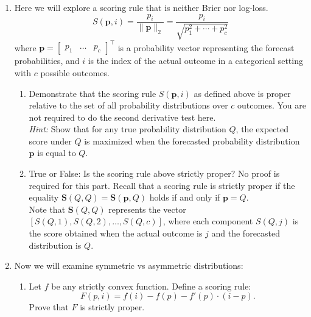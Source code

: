 \documentclass[11pt]{article}
\begin{document}
\begin{enumerate}
    \item Here we will explore a scoring rule that is neither Brier nor log-loss.
$$
S(\mathbf{p}, i) = \frac{p_i}{\|\mathbf{p}\|_{2}} = \frac{p_i}{\sqrt{p_1^2 + \cdots + p_c^2}}
$$
where \( \mathbf{p} = \begin{bmatrix}    
p_1 & \ldots & p_c 
\end{bmatrix}^\top
\) is a probability vector representing the forecast probabilities, and \( i \) is the index of the actual outcome in a categorical setting with \( c \) possible outcomes.
\begin{enumerate}
    \item Demonstrate that the scoring rule \( S(\mathbf{p}, i) \) as defined above is proper relative to the set of all probability distributions over \( c \) outcomes. You are not required to do the second derivative test here. \\
    \textit{Hint:} Show that for any true probability distribution \( Q \), the expected score under \( Q \) is maximized when the forecasted probability distribution \( \mathbf{p} \) is equal to \( Q \).
    \item True or False: Is the scoring rule above strictly proper? No proof is required for this part. Recall that a scoring rule is strictly proper if the equality \( \mathbf{S}(Q, Q) = \mathbf{S}(\mathbf{p}, Q) \) holds if and only if \( \mathbf{p} = Q \). \\
    Note that \( \mathbf{S}(Q, Q) \) represents the vector \([S(Q, 1), S(Q, 2), \ldots, S(Q, c)]\), where each component \( S(Q, j) \) is the score obtained when the actual outcome is \( j \) and the forecasted distribution is \( Q \).
\end{enumerate}

    \item Now we will examine symmetric vs asymmetric distributions:
\begin{enumerate}
    \item Let \( f \) be any strictly convex function. Define a scoring rule: 
    $$F(p, i) = f(i) - f(p) - f'(p) \cdot (i - p).$$
    Prove that \( F \) is strictly proper.
    

\end{enumerate}
\end{enumerate}
\end{document}
